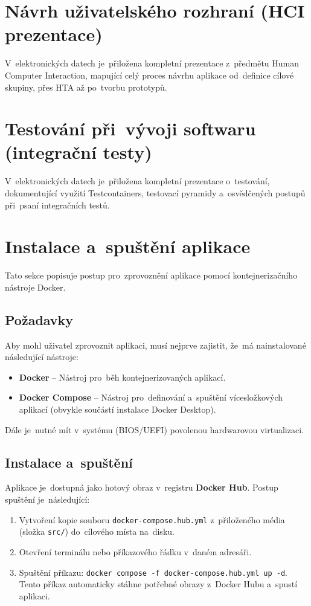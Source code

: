 \documentclass[
  master,
  program=ainfvs,
  printversion,
  figures=false,
  tables=false,
  glossaries,
  index
]{kidiplom}
\begin{document}
\appendix

\section{Návrh uživatelského rozhraní (HCI prezentace)} \label{sec:priloha_hci}
V~elektronických datech je~přiložena kompletní prezentace z~předmětu Human Computer Interaction, mapující celý proces návrhu aplikace od~definice cílové skupiny, přes HTA až po~tvorbu prototypů.

\section{Testování při~vývoji softwaru (integrační testy)} \label{sec:priloha_testing}
V~elektronických datech je~přiložena kompletní prezentace o~testování, dokumentující využití Testcontainers, testovací pyramidy a~osvědčených postupů při~psaní integračních testů.

\section{Instalace a~spuštění aplikace} \label{sec:instalace}
Tato sekce popisuje postup pro~zprovoznění aplikace pomocí kontejnerizačního nástroje Docker.

\subsection{Požadavky}
Aby mohl uživatel zprovoznit aplikaci, musí nejprve zajistit, že~má nainstalované následující nástroje:
\begin{itemize}
    \item \textbf{Docker} -- Nástroj pro~běh kontejnerizovaných aplikací.
    \item \textbf{Docker Compose} -- Nástroj pro~definování a~spuštění vícesložkových aplikací (obvykle součástí instalace Docker Desktop).
\end{itemize}
Dále je~nutné mít v~systému (BIOS/UEFI) povolenou hardwarovou virtualizaci.

\subsection{Instalace a~spuštění}
Aplikace je~dostupná jako hotový obraz v~registru \textbf{Docker Hub}. Postup spuštění je~následující:
\begin{enumerate}
    \item Vytvoření kopie souboru \texttt{docker-compose.hub.yml} z~přiloženého média (složka \texttt{src/}) do~cílového místa na~disku.
    \item Otevření terminálu nebo příkazového řádku v~daném adresáři.
    \item Spuštění příkazu: \texttt{docker compose -f docker-compose.hub.yml up -d}. Tento příkaz automaticky stáhne potřebné obrazy z~Docker Hubu a~spustí aplikaci.
\end{enumerate}
\end{document}

